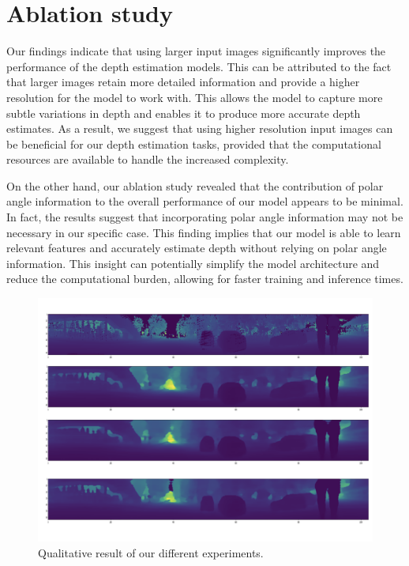 \documentclass[english, LaM, oneside]{sapthesis}%
\begin{document}
\section{Ablation study}
Our findings indicate that using larger input images significantly improves the performance of the depth estimation models. This can be attributed to the fact that larger images retain more detailed information and provide a higher resolution for the model to work with. This allows the model to capture more subtle variations in depth and enables it to produce more accurate depth estimates. As a result, we suggest that using higher resolution input images can be beneficial for our depth estimation tasks, provided that the computational resources are available to handle the increased complexity.

On the other hand, our ablation study revealed that the contribution of polar angle information to the overall performance of our model appears to be minimal. In fact, the results suggest that incorporating polar angle information may not be necessary in our specific case. This finding implies that our model is able to learn relevant features and accurately estimate depth without relying on polar angle information. This insight can potentially simplify the model architecture and reduce the computational burden, allowing for faster training and inference times.



\begin{figure}[h!] %
    \centering
    \includegraphics[width=\linewidth]{Images/re(1).png}
    \caption{Qualitative result of our different experiments.}
    \label{fig:l}
\end{figure}
\end{document}

